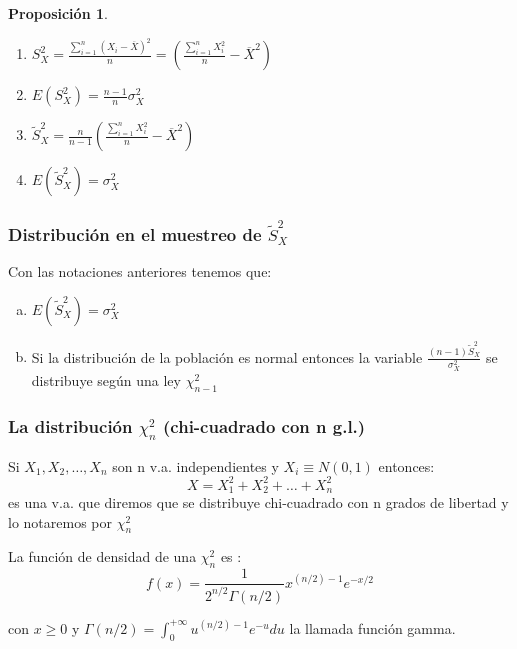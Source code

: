 \documentclass[12pt]{report}
\newtheorem{proposition}[definition]{Proposici\'on}
\begin{document}
  \begin{proposition}
  \begin{enumerate}
\item $S^2_X=\frac{\sum_{i=1}^n (X_{i}-\overline{X})^2}{n}=\left(\frac{\sum_{i=1}^n
X_{i}^2}{n}-\overline{X}^2\right)$
\item $E(S^2_X)=\frac{n-1}{n} \sigma^2_X$
\item $\tilde{S}_{X}^2=\frac{n}{n-1}\left(\frac{\sum_{i=1}^n
X_{i}^2}{n}-\overline{X}^2\right)$
\item $E(\tilde{S}_{X}^2)=\sigma_{X}^2$
\end{enumerate}
\end{proposition}

    \subsubsection{Distribución en el muestreo de $\tilde{S}_{X}^2$}
    Con las notaciones anteriores tenemos que:

    \begin{enumerate}[a)]
        \item $E(\tilde{S}_{X}^2)=\sigma_{X}^2$
        \item Si la distribución de la población es normal entonces
        la variable $\frac{(n-1)\tilde{S}_{X}^2}{\sigma_{X}^2}$ se distribuye
        según una ley $\chi_{n-1}^2$
        \end{enumerate}

    \subsubsection{La distribución $\chi^{2}_{n}$ (chi-cuadrado con n g.l.)}

Si $X_{1},X_{2},\ldots, X_{n}$ son n  v.a. independientes y $X_{i}\equiv N(0,1)$ entonces:
$$X=X_{1}^{2}+X_{2}^{2}+\ldots +X_{n}^{2}$$ es una v.a. que diremos que se distribuye
chi-cuadrado con n grados de libertad y lo notaremos por $\chi^{2}_{n}$


La función de densidad de una $\chi^{2}_{n}$  es :
$$f(x)={\frac{1}{2^{n/2} \Gamma (n/2)}} x^{(n/2)-1} e^{-x/2}$$

con $x\geq 0$ y $\Gamma(n/2)=\int_{0}^{+\infty} u^{(n/2)-1}e^{-u}du$ la llamada función
gamma.
\end{document}
